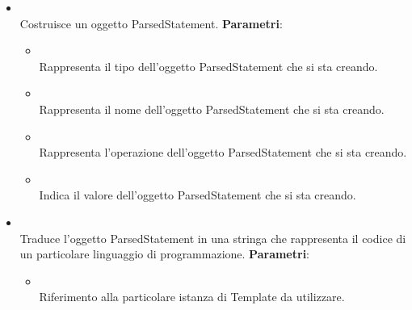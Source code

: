 \begin{itemize}
\begin{itemize}
\item {}
\\ Costruisce un oggetto ParsedStatement.
\textbf{Parametri}:
\begin{itemize}
\item {}
\\ Rappresenta il tipo dell'oggetto ParsedStatement che si sta creando.
\item {}
\\ Rappresenta il nome dell'oggetto ParsedStatement che si sta creando.
\item {}
\\ Rappresenta l'operazione dell'oggetto ParsedStatement che si sta creando.
\item {}
\\ Indica il valore dell'oggetto ParsedStatement che si sta creando.
\end{itemize}
\item {}
\\ Traduce l'oggetto ParsedStatement in una stringa che rappresenta il codice di un particolare linguaggio di programmazione.
\textbf{Parametri}:
\begin{itemize}
\item {}
\\ Riferimento alla particolare istanza di Template da utilizzare.
\end{itemize}
\end{itemize}
\end{itemize}

